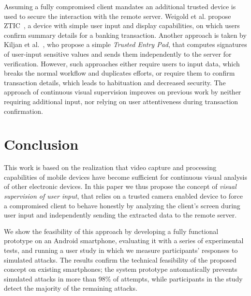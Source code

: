Assuming a fully compromised client mandates an additional trusted device is used to secure the interaction with the remote server.
Weigold et al. propose ZTIC~\cite{weigold2011}, a device with simple user input and display capabilities, on which users confirm summary details for a banking transaction.
Another approach is taken by Kiljan et al.~\cite{6978928}, who propose a simple \emph{Trusted Entry Pad}, that computes signatures of user-input sensitive values and sends them independently to the server for verification.
However, such approaches either require users to input data, which breaks the normal workflow and duplicates efforts, or require them to confirm transaction details, which leads to habituation and decreased security.
The approach of continuous visual supervision improves on previous work by neither requiring additional input, nor relying on user attentiveness during transaction confirmation.


\section{Conclusion} \label{sec:conclusion}

This work is based on the realization that video capture and processing capabilities of mobile devices have become sufficient for continuous visual analysis of other electronic devices.
In this paper we thus propose the concept of \emph{visual supervision of user input}, that relies on a trusted camera enabled device to force a compromised client to behave honestly by analyzing the client's screen during user input and independently sending the extracted data to the remote server.

We show the feasibility of this approach by developing a fully functional prototype on an Android smartphone, evaluating it with a series of experimental tests, and running a user study in which we measure participants' responses to simulated attacks.
The results confirm the technical feasibility of the proposed concept on existing smartphones; the system prototype automatically prevents simulated attacks in more than 98\% of attempts, while participants in the study detect the majority of the remaining attacks.

